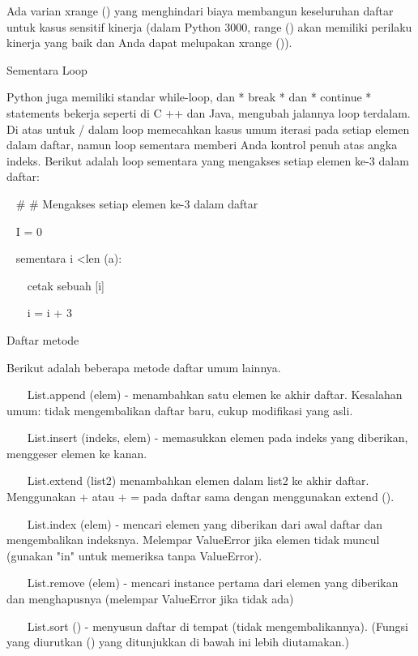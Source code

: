 Ada varian xrange () yang menghindari biaya membangun keseluruhan daftar untuk kasus sensitif kinerja (dalam Python 3000, range () akan memiliki perilaku kinerja yang baik dan Anda dapat melupakan xrange ()). \par
Sementara Loop \par
\vspace{12pt}
Python juga memiliki standar while-loop, dan * break * dan * continue * statements bekerja seperti di C ++ dan Java, mengubah jalannya loop terdalam. Di atas untuk / dalam loop memecahkan kasus umum iterasi pada setiap elemen dalam daftar, namun loop sementara memberi Anda kontrol penuh atas angka indeks. Berikut adalah loop sementara yang mengakses setiap elemen ke-3 dalam daftar: \par
\vspace{12pt}
~  $  \#  $ $  \#  $ Mengakses setiap elemen ke-3 dalam daftar \par
~ I = 0 \par
~ sementara i <len (a): \par
~~~ cetak sebuah [i] \par
~~~ i = i + 3 \par
Daftar metode \par
\vspace{12pt}
Berikut adalah beberapa metode daftar umum lainnya. \par
\vspace{12pt}
~~~ List.append (elem) - menambahkan satu elemen ke akhir daftar. Kesalahan umum: tidak mengembalikan daftar baru, cukup modifikasi yang asli. \par
~~~ List.insert (indeks, elem) - memasukkan elemen pada indeks yang diberikan, menggeser elemen ke kanan. \par
~~~ List.extend (list2) menambahkan elemen dalam list2 ke akhir daftar. Menggunakan + atau + = pada daftar sama dengan menggunakan extend (). \par
~~~ List.index (elem) - mencari elemen yang diberikan dari awal daftar dan mengembalikan indeksnya. Melempar ValueError jika elemen tidak muncul (gunakan "in" untuk memeriksa tanpa ValueError). \par
~~~ List.remove (elem) - mencari instance pertama dari elemen yang diberikan dan menghapusnya (melempar ValueError jika tidak ada) \par
~~~ List.sort () - menyusun daftar di tempat (tidak mengembalikannya). (Fungsi yang diurutkan () yang ditunjukkan di bawah ini lebih diutamakan.) \par

